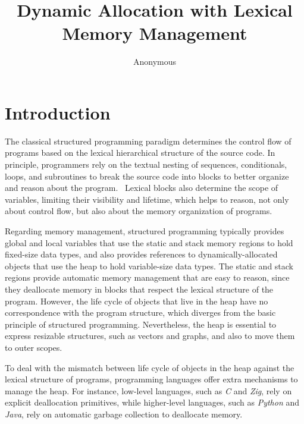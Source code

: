 \documentclass[12pt]{article}
\title {
    Dynamic Allocation with Lexical Memory Management
}
\author{Anonymous}
\begin{document}
\maketitle

\begin{abstract}
\end{abstract}


\section{Introduction}

The classical structured programming paradigm determines the control flow of
programs based on the lexical hierarchical structure of the source code.
%
In principle, programmers rely on the textual nesting of sequences,
conditionals, loops, and subroutines to break the source code into blocks to
better organize and reason about the program.~\cite{TODO}
%
Lexical blocks also determine the scope of variables, limiting their visibility
and lifetime, which helps to reason, not only about control flow, but also
about the memory organization of programs.

Regarding memory management, structured programming typically provides global
and local variables that use the static and stack memory regions to hold
fixed-size data types, and also provides references to dynamically-allocated
objects that use the heap to hold variable-size data types.
%
The static and stack regions provide automatic memory management that are easy
to reason, since they deallocate memory in blocks that respect the lexical
structure of the program.
%
However, the life cycle of objects that live in the heap have no correspondence
with the program structure, which diverges from the basic principle of
structured programming.
%
Nevertheless, the heap is essential to express resizable structures, such as
vectors and graphs, and also to move them to outer scopes.

To deal with the mismatch between life cycle of objects in the heap against the
lexical structure of programs, programming languages offer extra mechanisms to
manage the heap.
%
For instance, low-level languages, such as \emph{C} and \emph{Zig}, rely on
explicit deallocation primitives, while higher-level languages, such as
\emph{Python} and \emph{Java}, rely on automatic garbage collection to
deallocate memory.
\end{document}
